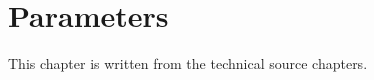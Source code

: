 \chapter{Parameters}\label{ch:parameters}

This chapter is written from the technical source chapters.
